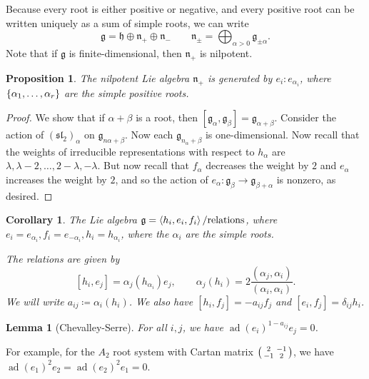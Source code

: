 \documentclass[leqno, openany]{memoir}
\newtheorem{cor}[thm]{Corollary}
\newtheorem{prop}[thm]{Proposition}
\newtheorem{lem}[thm]{Lemma}
\theoremstyle{definition}
\theoremstyle{remark}
\theoremstyle{plain}
\theoremstyle{definition}
\theoremstyle{remark}
\newcommand{\mf}[1]{\mathfrak{#1}}
\DeclareMathOperator{\ad}{ad}
\begin{document}
Because every root is either positive or negative, and every positive root can be written uniquely as a sum of simple roots, we can write 
\[ \mf{g} = \mf{h} \oplus \mf{n}_+ \oplus \mf{n}_- \qquad \mf{n}_{\pm} = \bigoplus_{\alpha > 0} \mf{g}_{\pm \alpha}. \]
Note that if $\mf{g}$ is finite-dimensional, then $\mf{n}_+$ is nilpotent.

\begin{prop}
    The nilpotent Lie algebra $\mf{n}_+$ is generated by $e_i \colon e_{\alpha_i}$, where $\qty{\alpha_1, \ldots, \alpha_r}$ are the simple positive roots.
\end{prop}

\begin{proof}
    We show that if $\alpha + \beta$ is a root, then $[\mf{g}_{\alpha}, \mf{g}_{\beta}] = \mf{g}_{\alpha + \beta}$. Consider the action of ${(\mf{sl}_2)}_{\alpha}$ on $\mf{g}_{n \alpha + \beta}$. Now each $\mf{g}_{n_{\alpha} + \beta}$ is one-dimensional. Now recall that the weights of irreducible representations with respect to $h_{\alpha}$ are $\lambda, \lambda - 2, \ldots, 2-\lambda, -\lambda$. But now recall that $f_{\alpha}$ decreases the weight by $2$ and $e_{\alpha}$ increases the weight by $2$, and so the action of $e_{\alpha} \colon \mf{g}_{\beta} \to \mf{g}_{\beta + \alpha}$ is nonzero, as desired.
\end{proof}

\begin{cor}
    The Lie algebra $\mf{g} = \ev{h_i, e_i, f_i} / \text{relations}$, where $e_i = e_{\alpha_i}, f_i = e_{-\alpha_i}, h_i = h_{\alpha_i}$, where the $\alpha_i$ are the simple roots.

    The relations are given by
    \[ [h_i, e_j] = \alpha_j(h_{\alpha_i}) e_j, \qquad \alpha_j(h_i) = 2 \frac{(\alpha_j, \alpha_i)}{(\alpha_i, \alpha_i)}. \]
    We will write $a_{ij} \coloneqq \alpha_i(h_i)$. We also have $[h_i, f_j] = - a_{ij} f_j$ and $[e_i, f_j] = \delta_{ij} h_i$.
\end{cor}

\begin{lem}[Chevalley-Serre]
    For all $i,j$, we have ${\ad(e_i)}^{1-a_{ij}} e_j = 0$.
\end{lem}

For example, for the $A_2$ root system with Cartan matrix $\begin{psmallmatrix} 2 & -1 \\ -1 & 2 \end{psmallmatrix}$, we have ${\ad(e_1)}^2 e_2 = {\ad(e_2)}^2 e_1 = 0$.
\end{document}
